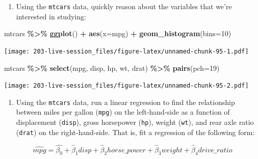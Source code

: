 \documentclass[
]{book}
\newenvironment{Shaded}{\begin{snugshade}}{\end{snugshade}}
\newcommand{\AttributeTok}[1]{\textcolor[rgb]{0.13,0.29,0.53}{#1}}
\newcommand{\DecValTok}[1]{\textcolor[rgb]{0.00,0.00,0.81}{#1}}
\newcommand{\FunctionTok}[1]{\textcolor[rgb]{0.13,0.29,0.53}{\textbf{#1}}}
\newcommand{\NormalTok}[1]{#1}
\newcommand{\SpecialCharTok}[1]{\textcolor[rgb]{0.81,0.36,0.00}{\textbf{#1}}}
\providecommand{\tightlist}{%
  \setlength{\itemsep}{0pt}\setlength{\parskip}{0pt}}
\theoremstyle{definition}
\theoremstyle{definition}
\theoremstyle{definition}
\theoremstyle{definition}
\theoremstyle{remark}
\begin{document}
\begin{enumerate}
\def\labelenumi{\arabic{enumi}.}
\setcounter{enumi}{-1}
\tightlist
\item
  Using the \texttt{mtcars} data, quickly reason about the variables that we're interested in studying:
\end{enumerate}

\begin{Shaded}
\begin{Highlighting}[]
\NormalTok{mtcars }\SpecialCharTok{\%\textgreater{}\%} 
  \FunctionTok{ggplot}\NormalTok{() }\SpecialCharTok{+} 
  \FunctionTok{aes}\NormalTok{(}\AttributeTok{x=}\NormalTok{mpg) }\SpecialCharTok{+}
  \FunctionTok{geom\_histogram}\NormalTok{(}\AttributeTok{bins=}\DecValTok{10}\NormalTok{)}
\end{Highlighting}
\end{Shaded}

\texttt{[image: 203-live-session\_files/figure-latex/unnamed-chunk-95-1.pdf]}

\begin{Shaded}
\begin{Highlighting}[]
\NormalTok{mtcars }\SpecialCharTok{\%\textgreater{}\%} 
  \FunctionTok{select}\NormalTok{(mpg, disp, hp, wt, drat) }\SpecialCharTok{\%\textgreater{}\%} 
  \FunctionTok{pairs}\NormalTok{(}\AttributeTok{pch=}\DecValTok{19}\NormalTok{)}
\end{Highlighting}
\end{Shaded}

\texttt{[image: 203-live-session\_files/figure-latex/unnamed-chunk-95-2.pdf]}

\begin{enumerate}
\def\labelenumi{\arabic{enumi}.}
\tightlist
\item
  Using the \texttt{mtcars} data, run a linear regression to find the relationship between miles per gallon (\texttt{mpg}) on the left-hand-side as a function of displacement (\texttt{disp}), gross horsepower (\texttt{hp}), weight (\texttt{wt}), and rear axle ratio (\texttt{drat}) on the right-hand-side. That is, fit a regression of the following form:
\end{enumerate}

\[
\widehat{mpg} = \hat{\beta_{0}} + \hat{\beta}_{1} disp + \hat{\beta}_{2}horse\_power + \hat{\beta}_{3}weight + \hat{\beta}_{4}drive\_ratio
\]
\end{document}
